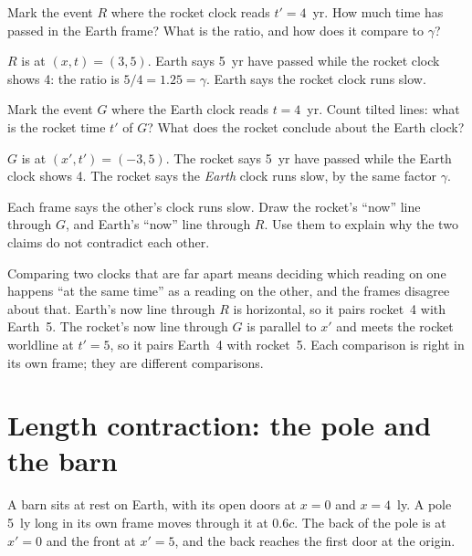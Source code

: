 \documentclass{handout}
\newcommand{\room}[1]{0.35in plus #1fill}
\begin{document}
\begin{questions}
  \question Mark the event $R$ where the rocket clock reads $t' = 4$~yr. How
  much time has passed in the Earth frame? What is the ratio, and how does it
  compare to $\gamma$?
  \begin{solution}[\room{1}]
    $R$ is at $(x,t)=(3,5)$. Earth says 5~yr have passed while the rocket clock
    shows 4: the ratio is $5/4 = 1.25 = \gamma$. Earth says the rocket clock
    runs slow.
  \end{solution}

  \question Mark the event $G$ where the Earth clock reads $t = 4$~yr. Count
  tilted lines: what is the rocket time $t'$ of $G$? What does the rocket
  conclude about the Earth clock?
  \begin{solution}[\room{1}]
    $G$ is at $(x',t') = (-3,5)$. The rocket says 5~yr have passed while the
    Earth clock shows 4. The rocket says the \emph{Earth} clock runs slow, by the
    same factor $\gamma$.
  \end{solution}

\newpage
  \question Each frame says the other's clock runs slow. Draw the rocket's
  ``now'' line through $G$, and Earth's ``now'' line through $R$. Use them to
  explain why the two claims do not contradict each other.
  \begin{solution}[\room{1}]
    Comparing two clocks that are far apart means deciding which reading on one
    happens ``at the same time'' as a reading on the other, and the frames
    disagree about that. Earth's now line through $R$ is horizontal, so it pairs
    rocket~4 with Earth~5. The rocket's now line through $G$ is parallel to $x'$
    and meets the rocket worldline at $t'=5$, so it pairs Earth~4 with rocket~5.
    Each comparison is right in its own frame; they are different comparisons.
  \end{solution}
\end{questions}

\newpage
\section{Length contraction: the pole and the barn}

A barn sits at rest on Earth, with its open doors at $x=0$ and $x=4$~ly. A
pole 5~ly long in its own frame moves through it at $0.6c$. The back of the
pole is at $x' = 0$ and the front at $x' = 5$, and the back reaches the first
door at the origin.
\end{document}
